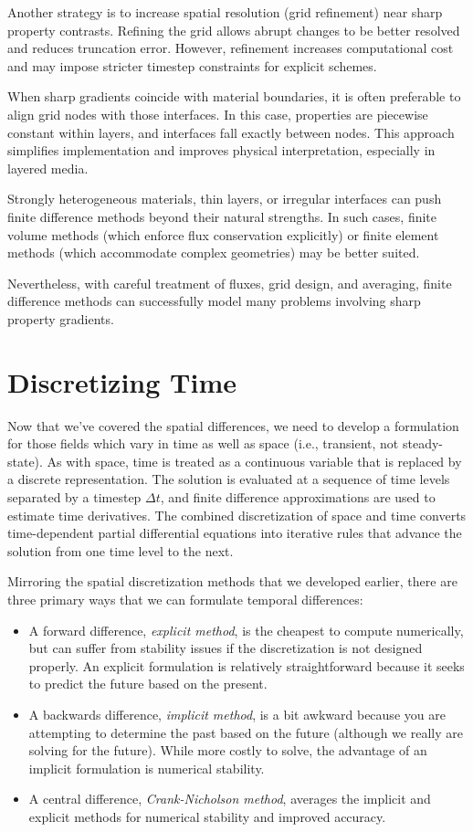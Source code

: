 Another strategy is to increase spatial resolution (grid refinement) near sharp property contrasts. Refining the grid allows abrupt changes to be better resolved and reduces truncation error. However, refinement increases computational cost and may impose stricter timestep constraints for explicit schemes.

When sharp gradients coincide with material boundaries, it is often preferable to align grid nodes with those interfaces. In this case, properties are piecewise constant within layers, and interfaces fall exactly between nodes.  This approach simplifies implementation and improves physical interpretation, especially in layered media.

Strongly heterogeneous materials, thin layers, or irregular interfaces can push finite difference methods beyond their natural strengths. In such cases, finite volume methods (which enforce flux conservation explicitly) or finite element methods (which accommodate complex geometries) may be better suited.

Nevertheless, with careful treatment of fluxes, grid design, and averaging, finite difference methods can successfully model many problems involving sharp property gradients.


\section{Discretizing Time}

Now that we've covered the spatial differences, we need to develop a formulation for those fields which vary in time as well as space (i.e., transient, not steady-state).  As with space, time is treated as a continuous variable that is replaced by a discrete representation. The solution is evaluated at a sequence of time levels separated by a timestep $\Delta t$, and finite difference approximations are used to estimate time derivatives. The combined discretization of space and time converts time-dependent partial differential equations into iterative rules that advance the solution from one time level to the next.

Mirroring the spatial discretization methods that we developed earlier, there are three primary ways that we can formulate temporal differences:
\begin{itemize}
    \item A forward difference, \emph{explicit method}, is the cheapest to compute numerically, but can suffer from stability issues if the discretization is not designed properly.  An explicit formulation is relatively straightforward because it seeks to predict the future based on the present. 
    \item  A backwards difference, \emph{implicit method}, is a bit awkward because you are attempting to determine the past based on the future (although we really are solving for the future).  While more costly to solve, the advantage of an implicit formulation is numerical stability.
    \item A central difference, \emph{Crank-Nicholson method}, averages the implicit and explicit methods for numerical stability and improved accuracy.
\end{itemize}

